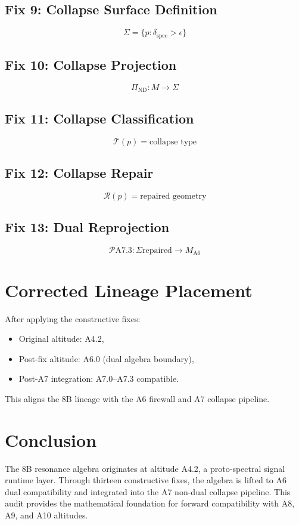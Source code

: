 \documentclass[11pt]{article}
\begin{document}
\subsection{Fix 9: Collapse Surface Definition}
\[
\Sigma = \{ p : \delta_{\mathrm{spec}} > \epsilon \}
\]

\subsection{Fix 10: Collapse Projection}
\[
\Pi_{\mathrm{ND}} : M \to \Sigma
\]

\subsection{Fix 11: Collapse Classification}
\[
\mathcal{T}(p) = \text{collapse type}
\]

\subsection{Fix 12: Collapse Repair}
\[
\mathcal{R}(p) = \text{repaired geometry}
\]

\subsection{Fix 13: Dual Reprojection}
\[
\mathcal{P}{\mathrm{A7.3}} : \Sigma{\mathrm{repaired}} \to M_{\mathrm{A6}}
\]

\section{Corrected Lineage Placement}

After applying the constructive fixes:
\begin{itemize}
  \item Original altitude: A4.2,
  \item Post-fix altitude: A6.0 (dual algebra boundary),
  \item Post-A7 integration: A7.0--A7.3 compatible.
\end{itemize}

This aligns the 8B lineage with the A6 firewall and A7 collapse pipeline.

\section{Conclusion}

The 8B resonance algebra originates at altitude A4.2, a proto-spectral
signal runtime layer. Through thirteen constructive fixes, the algebra
is lifted to A6 dual compatibility and integrated into the A7 non-dual
collapse pipeline. This audit provides the mathematical foundation for
forward compatibility with A8, A9, and A10 altitudes.
\end{document}
